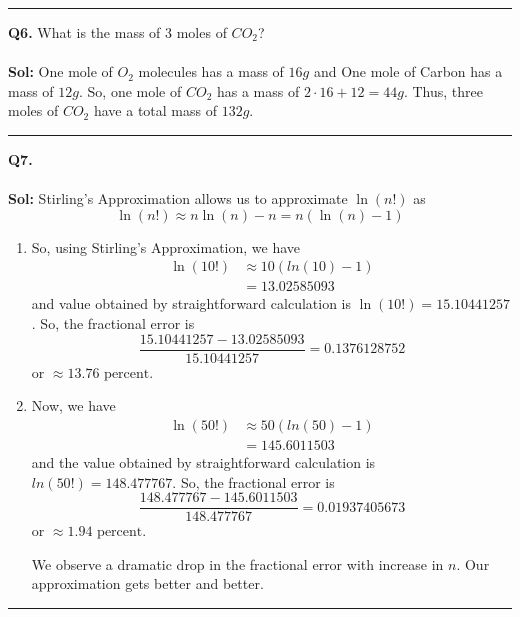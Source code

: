 \documentclass[twoside]{article}
\begin{document}
\vskip 0.25cm
\hrule
\vskip 1cm

\textbf{Q6.} What is the mass of 3 moles of $CO_2$?
\\
\\
\textbf{Sol:} One mole of $O_2$ molecules has a mass of $16g$ and One mole of Carbon has a mass of $12g$. So, one mole of $CO_2$ has a mass of $2\cdot16 + 12 = 44g$. Thus, three moles of $CO_2$ have a total mass of $\boxed{132g}$.
\vskip 0.25cm
\hrule
\vskip 1cm


\textbf{Q7.} 
\\
\\
\textbf{Sol:} Stirling's Approximation allows us to approximate $\ln(n!)$ as 
\[ \ln(n!) \approx n\ln(n) - n = n(\ln(n) - 1) \]

\begin{enumerate}[label=(\alph*)]
   \item So, using Stirling's Approximation, we have 
   \begin{align*}
      \ln(10!) &\approx 10(ln(10) - 1) \\
              &= 13.02585093
   \end{align*}
   and value obtained by straightforward calculation is $\ln(10!) = 15.10441257$. So, the fractional error is 
   \[ \frac{15.10441257 - 13.02585093}{15.10441257} = 0.1376128752\]
   or $\boxed{\approx 13.76 \text{ percent}}$.

   \item Now, we have 
   \begin{align*}
      \ln(50!) &\approx 50(ln(50) - 1) \\
      &= 145.6011503
   \end{align*}
   and the value obtained by straightforward calculation is $ln(50!) = 148.477767$. So, the fractional error is 
   \[ \frac{148.477767 - 145.6011503}{148.477767} = 0.01937405673\]
   or $\boxed{\approx  1.94 \text{ percent}}$.

   We observe a dramatic drop in the fractional error with increase in $n$. Our approximation gets better and better.
\end{enumerate}
\vskip 0.25cm
\hrule
\vskip 1cm
\end{document}
